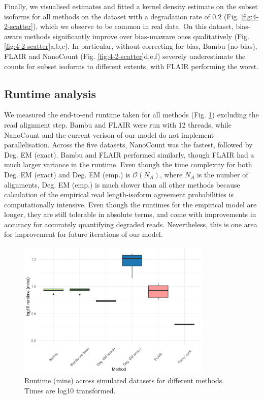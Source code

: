 \newpage

Finally, we visualised estimates and fitted a kernel density estimate on the subset isoforms for all methods on the dataset with a degradation rate of 0.2 (Fig. \ref{fig:4-2-scatter}), which we observe to be common in real data. On this dataset, bias-aware methods significantly improve over bias-unaware ones qualitatively (Fig. \ref{fig:4-2-scatter}a,b,c). In particular, without correcting for bias, Bambu (no bias), FLAIR and NanoCount (Fig. \ref{fig:4-2-scatter}d,e,f) severely underestimate the counts for subset isoforms to different extents, with FLAIR performing the worst.

\subsection{Runtime analysis}

We measured the end-to-end runtime taken for all methods (Fig. \ref{fig:runtime}) excluding the read alignment step. Bambu and FLAIR were run with 12 threads, while NanoCount and the current verison of our model do not implement parallelisation. Across the five datasets, NanoCount was the fastest, followed by Deg. EM (exact). Bambu and FLAIR performed similarly, though FLAIR had a much larger variance in the runtime. Even though the time complexity for both Deg. EM (exact) and Deg. EM (emp.) is $\mathcal{O}(N_A)$, where $N_A$ is the number of alignments, Deg. EM (emp.) is much slower than all other methods because calculation of the empirical read length-isoform agreement probabilities is computationally intensive. Even though the runtimes for the empirical model are longer, they are still tolerable in absolute terms, and come with improvements in accuracy for accurately quantifying degraded reads. Nevertheless, this is one area for improvement for future iterations of our model.  

\begin{figure}[H]
    \centering
    \includegraphics[width=0.825\textwidth]{figures/sec-4-runtime.png}
    \caption[Runtime across simulated datasets for different methods]{Runtime (mins) across simulated datasets for different methods. Times are log10 transformed.}
    \label{fig:runtime}
\end{figure}

